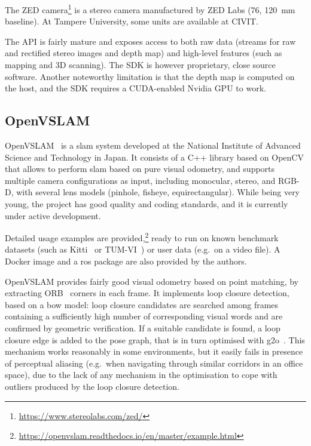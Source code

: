 \documentclass[11pt, letterpaper, twoside]{article}
\begin{document}
The ZED camera\footnote{\url{https://www.stereolabs.com/zed/}} is a stereo
camera manufactured by ZED Labs (76\textdegree{}\textdegree, 120~mm
baseline). At Tampere University, some units are available at CIVIT.

The API is fairly mature and exposes access to both raw data (streams for raw
and rectified stereo images and depth map) and high-level features (such as
mapping and 3D scanning). The SDK is however proprietary, close source
software. Another noteworthy limitation is that the depth map is computed on
the host, and the SDK requires a CUDA-enabled Nvidia GPU to work.

\subsection{OpenVSLAM}

OpenVSLAM~\cite{openvslam2019} is a \gls{slam} system developed at the National
Institute of Advanced Science and Technology in Japan. It consists of a C++
library based on OpenCV that allows to perform \gls{slam} based on pure visual
odometry, and supports multiple camera configurations as input, including
monocular, stereo, and RGB-D, with several lens models (pinhole, fisheye,
equirectangular). While being very young, the project has good quality and
coding standards, and it is currently under active development.

Detailed usage examples are
provided,\footnote{\url{https://openvslam.readthedocs.io/en/master/example.html}}
ready to run on known benchmark datasets (such as Kitti~\cite{geiger2013vision}
or TUM-VI~\cite{schubert2018vidataset}) or user data (e.g.\ on a video file). A
Docker image and a \gls{ros} package are also provided by the authors.

OpenVSLAM provides fairly good visual odometry based on point matching, by
extracting ORB~\cite{rublee2011orb} corners in each frame. It implements loop
closure detection, based on a \gls{bow} model: loop closure candidates are
searched among frames containing a sufficiently high number of corresponding
visual words and are confirmed by geometric verification. If a suitable
candidate is found, a loop closure edge is added to the pose graph, that is in
turn optimised with g2o~\cite{grisetti2011g2o}. This mechanism works reasonably
in some environments, but it easily fails in presence of perceptual aliasing
(e.g.\ when navigating through similar corridors in an office space), due to
the lack of any mechanism in the optimisation to cope with outliers produced by
the loop closure detection.
\end{document}

